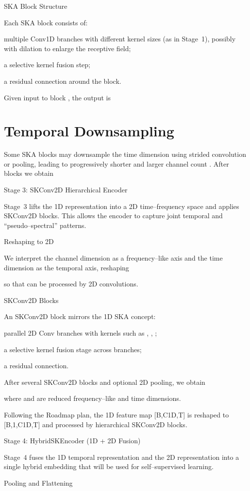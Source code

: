 \documentclass[12pt]{article}
\begin{document}
SKA Block Structure

Each SKA block consists of:

multiple Conv1D branches with different kernel sizes (as in Stage 1), possibly with dilation to enlarge the receptive field;

a selective kernel fusion step;

a residual connection around the block.

Given input  to block , the output is


\section*{Temporal Downsampling}
Some SKA blocks may downsample the time dimension using strided convolution or pooling, leading to progressively shorter  and larger channel count . After  blocks we obtain


Stage 3: SKConv2D Hierarchical Encoder

Stage 3 lifts the 1D representation into a 2D time–frequency space and applies SKConv2D blocks. This allows the encoder to capture joint temporal and “pseudo–spectral” patterns.

Reshaping to 2D

We interpret the channel dimension  as a frequency–like axis and the time dimension  as the temporal axis, reshaping


so that  can be processed by 2D convolutions.

SKConv2D Blocks

An SKConv2D block mirrors the 1D SKA concept:

parallel 2D Conv branches with kernels such as , , ;

a selective kernel fusion stage across branches;

a residual connection.

After several SKConv2D blocks and optional 2D pooling, we obtain


where  and  are reduced frequency–like and time dimensions.

Following the Roadmap plan, the 1D feature map [B,C1D,T] is reshaped to [B,1,C1D,T] and processed by hierarchical SKConv2D blocks.

Stage 4: HybridSKEncoder (1D + 2D Fusion)

Stage 4 fuses the 1D temporal representation  and the 2D representation  into a single hybrid embedding that will be used for self–supervised learning.

Pooling and Flattening
\end{document}
